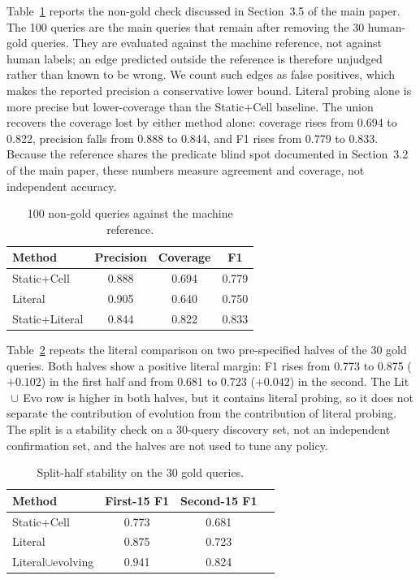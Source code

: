 \documentclass[sigconf, nonacm]{acmart}
\begin{document}
Table~\ref{tab:nongold} reports the non-gold check discussed in Section~3.5 of the main paper. The 100 queries are the main queries that remain after removing the 30 human-gold queries. They are evaluated against the machine reference, not against human labels; an edge predicted outside the reference is therefore unjudged rather than known to be wrong. We count such edges as false positives, which makes the reported precision a conservative lower bound. Literal probing alone is more precise but lower-coverage than the Static+Cell baseline. The union recovers the coverage lost by either method alone: coverage rises from 0.694 to 0.822, precision falls from 0.888 to 0.844, and F1 rises from 0.779 to 0.833. Because the reference shares the predicate blind spot documented in Section~3.2 of the main paper, these numbers measure agreement and coverage, not independent accuracy.

\begin{table}[h!]
\centering
\small
\caption{100 non-gold queries against the machine reference.}
\label{tab:nongold}
\begin{tabular}{lccc}
\toprule
Method & Precision & Coverage & F1 \\
\midrule
Static+Cell & 0.888 & 0.694 & 0.779 \\
Literal & 0.905 & 0.640 & 0.750 \\
Static+Literal & 0.844 & 0.822 & 0.833 \\
\bottomrule
\end{tabular}
\end{table}

Table~\ref{tab:splithalf} repeats the literal comparison on two pre-specified halves of the 30 gold queries. Both halves show a positive literal margin: F1 rises from 0.773 to 0.875 ($+0.102$) in the first half and from 0.681 to 0.723 ($+0.042$) in the second. The Lit$\,\cup\,$Evo row is higher in both halves, but it contains literal probing, so it does not separate the contribution of evolution from the contribution of literal probing. The split is a stability check on a 30-query discovery set, not an independent confirmation set, and the halves are not used to tune any policy.

\begin{table}[h!]
\centering
\small
\caption{Split-half stability on the 30 gold queries.}
\label{tab:splithalf}
\begin{tabular}{lccc}
\toprule
Method & First-15 F1 & Second-15 F1 \\
\midrule
Static+Cell & 0.773 & 0.681 \\
Literal & 0.875 & 0.723 \\
Literal$\cup$evolving & 0.941 & 0.824 \\
\bottomrule
\end{tabular}
\end{table}
\end{document}
